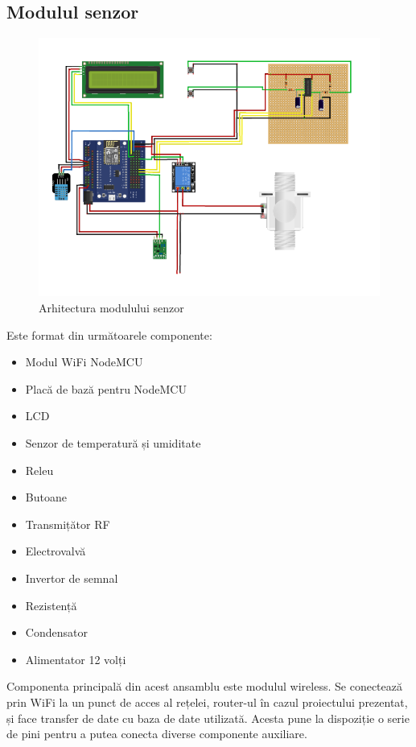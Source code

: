 \subsection{Modulul senzor}

\begin{figure}[H]
   	\centering
    	\includegraphics[width=1\textwidth]{ModulSenzor.png}
	\caption{Arhitectura modulului senzor}
\end{figure}	

	Este format din următoarele componente:
	\begin{itemize}
		\setlength{\itemindent}{2em}
			\itemsep0em
			\item Modul WiFi NodeMCU
			\item Placă de bază pentru NodeMCU
			\item LCD
			\item Senzor de temperatură și umiditate
			\item Releu
			\item Butoane
			\item Transmițător RF
			\item Electrovalvă
			\item Invertor de semnal
			\item Rezistență
			\item Condensator
			\item Alimentator 12 volți
	\end{itemize}

	Componenta principală din acest ansamblu este modulul wireless. Se conectează prin WiFi la un punct de acces al rețelei, router-ul în cazul proiectului prezentat, și face transfer de date cu baza de date utilizată. Acesta pune la dispoziție o serie de pini pentru a putea conecta diverse componente auxiliare. 
	
